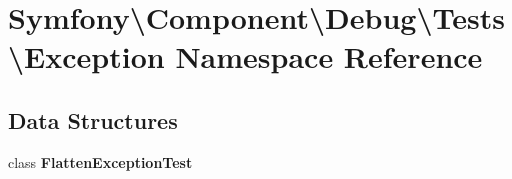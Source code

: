 \section{Symfony\textbackslash{}Component\textbackslash{}Debug\textbackslash{}Tests\textbackslash{}Exception Namespace Reference}
\label{namespace_symfony_1_1_component_1_1_debug_1_1_tests_1_1_exception}
\subsection*{Data Structures}
\begin{DoxyCompactItemize}
\item 
class {\bf Flatten\+Exception\+Test}
\end{DoxyCompactItemize}
